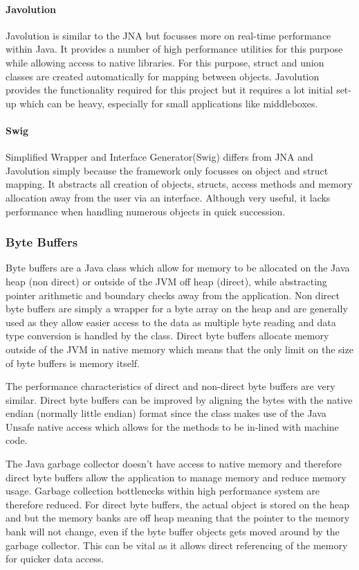 \documentclass[final_report.tex]{subfiles}
\begin{document}
\paragraph*{Javolution}
Javolution is similar to the JNA but focusses more on real-time performance within Java. It provides a number of high performance utilities for this purpose while allowing access to native libraries. For this purpose, struct and union classes are created automatically for mapping between objects. Javolution provides the functionality required for this project but it requires a lot initial set-up which can be heavy, especially for small applications like middleboxes.

\paragraph*{Swig}
Simplified Wrapper and Interface Generator(Swig) differs from JNA and Javolution simply because the framework only focusses on object and struct mapping. It abstracts all creation of objects, structs, access methods and memory allocation away from the user via an interface. Although very useful, it lacks performance when handling numerous objects in quick succession. 

\subsubsection{Byte Buffers}
Byte buffers are a Java class which allow for memory to be allocated on the Java heap (non direct) or outside of the JVM off heap (direct), while abstracting pointer arithmetic and boundary checks away from the application. Non direct byte buffers are simply a wrapper for a byte array on the heap and are generally used as they allow easier access to the data as multiple byte reading and data type conversion is handled by the class. Direct byte buffers allocate memory outside of the JVM in native memory which means that the only limit on the size of byte buffers is memory itself.

The performance characteristics of direct and non-direct byte buffers are very similar. Direct byte buffers can be improved by aligning the bytes with the native endian (normally little endian) format since the class makes use of the Java Unsafe native access which allows for the methods to be in-lined with machine code.

The Java garbage collector doesn't have access to native memory and therefore direct byte buffers allow the application to manage memory and reduce memory usage. Garbage collection bottlenecks within high performance system are therefore reduced. For direct byte buffers, the actual object is stored on the heap and but the memory banks are off heap meaning that the pointer to the memory bank will not change, even if the byte buffer objects gets moved around by the garbage collector. This can be vital as it allows direct referencing of the memory for quicker data access.
\end{document}
